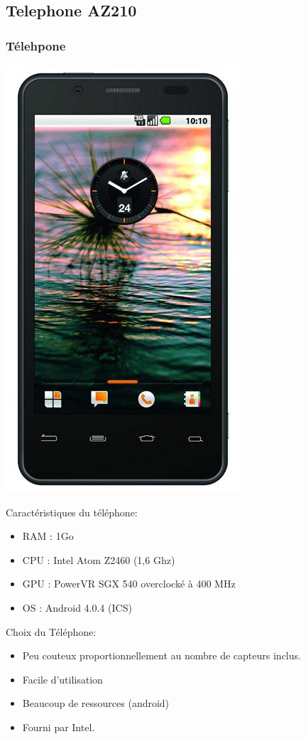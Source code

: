 \documentclass[transparent]{beamer}
\begin{document}
\subsection{Telephone AZ210}

\begin{frame}
	\frametitle{Télehpone}
	\begin{center}
 	\includegraphics[height=0.8\textheight]{images/telephone.png} 
	\end{center}

\end{frame}

\begin{frame} 
	\begin{block}{Caractéristiques du téléphone:}
			\begin{itemize}
				\item RAM : 1Go
				\item CPU : Intel Atom Z2460 (1,6 Ghz)
				\item GPU : PowerVR SGX 540 overclocké à 400 MHz
				\item OS : Android 4.0.4 (ICS)
			\end{itemize}
	\end{block}
	\begin{block}{Choix du Téléphone:}
			\begin{itemize}
				\item Peu couteux proportionnellement au nombre de capteurs inclus.
				\item Facile d'utilisation
				\item Beaucoup de ressources (android)
				\item Fourni par Intel.
			\end{itemize}
	\end{block}

\end{frame}
\end{document}
